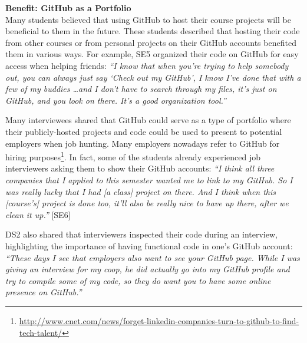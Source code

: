 
\textbf{Benefit: GitHub as a Portfolio} \\
Many students believed that using GitHub to host their course projects will be beneficial to them in the future. These students described that hosting their code from other courses or from personal projects on their GitHub accounts benefited them in various ways. For example, SE5 organized their code on GitHub for easy access when helping friends: \textit{``I know that when you're trying to help somebody out, you can always just say `Check out my GitHub', I know I've done that with a few of my buddies \ldots and I don't have to search through my files, it's just on GitHub, and you look on there. It's a good organization tool.''}

Many interviewees shared that GitHub could serve as a type of portfolio where their publicly-hosted projects and code could be used to present to potential employers when job hunting. Many employers nowadays refer to GitHub for hiring purposes\footnote{\url{http://www.cnet.com/news/forget-linkedin-companies-turn-to-github-to-find-tech-talent/}}. In fact, some of the students already experienced job interviewers asking them to show their GitHub accounts: \textit{``I think all three companies that I applied to this semester wanted me to link to my GitHub. So I was really lucky that I had [a class] project on there. And I think when this [course's] project is done too, it'll also be really nice to have up there, after we clean it up.''} [SE6]

DS2 also shared that interviewers inspected their code during an interview, highlighting the importance of having functional code in one's GitHub account: \textit{``These days I see that employers also want to see your GitHub page. While I was giving an interview for my coop, he did actually go into my GitHub profile and try to compile some of my code, so they do want you to have some online presence on GitHub.''}


